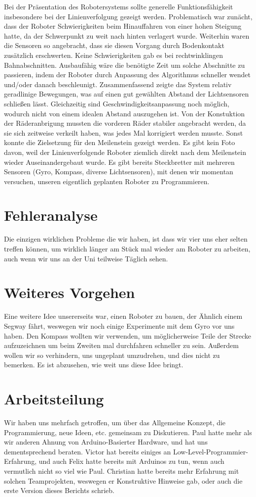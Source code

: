 \documentclass[11pt,a4paper]{article}
\begin{document}
Bei der Präsentation des Robotersystems sollte generelle Funktionsfähigkeit insbesondere bei der
Linienverfolgung gezeigt werden. Problematisch war zunächt, dass der Roboter Schwierigkeiten beim
Hinauffahren von einer hohen Steigung hatte, da der Schwerpunkt zu weit nach hinten verlagert 
wurde. Weiterhin waren die Sensoren so angebracht, dass sie diesen Vorgang durch Bodenkontakt 
zusätzlich erschwerten. Keine Schwierigkeiten gab es bei rechtwinklingen Bahnabschnitten. 
Ausbaufähig wäre die benötigte Zeit um solche Abschnitte zu passieren, indem der Roboter durch 
Anpassung des Algorithmus schneller wendet und/oder danach beschleunigt. Zusammenfassend zeigte 
das System relativ geradlinige Bewegungen, was auf einen gut gewählten Abstand der Lichtsensoren
schließen lässt. Gleichzeitig sind Geschwindigkeitsanpassung noch möglich, wodurch nicht von einem 
idealen Abstand auszugehen ist. Von der Konstuktion der Räderanbrigung mussten die vorderen Räder 
stabiler angebracht werden, da sie sich zeitweise verkeilt haben, was jedes Mal korrigiert werden
musste. Sonst konnte die Zielsetzung für den Meilenstein gezeigt werden. Es gibt kein Foto davon,
weil der Linienverfolgende Roboter ziemlich direkt nach dem Meilenstein wieder Auseinandergebaut
wurde. Es gibt bereits Steckbretter mit mehreren Sensoren (Gyro, Kompass, diverse Lichtsensoren),
mit denen wir momentan versuchen, unseren eigentlich geplanten Roboter zu Programmieren.

\section{Fehleranalyse}
Die einzigen wirklichen Probleme die wir haben, ist dass wir vier uns eher selten treffen können,
um wirklich länger am Stück mal wieder am Roboter zu arbeiten, auch wenn wir uns an der Uni
teilweise Täglich sehen.

\section{Weiteres Vorgehen}

Eine weitere Idee unsererseits war, einen Roboter zu bauen, der Ähnlich einem Segway fährt,
weswegen wir noch einige Experimente mit dem Gyro vor uns haben. Den Kompass wollten wir verwenden,
um möglicherweise Teile der Strecke aufzuzeichnen um beim Zweiten mal durchfahren schneller zu sein.
Außerdem wollen wir so verhindern, uns ungeplant umzudrehen, und dies nicht zu bemerken.
Es ist abzusehen, wie weit uns diese Idee bringt.

\section{Arbeitsteilung}
Wir haben uns mehrfach getroffen, um über das Allgemeine Konzept, die Programmierung, neue Ideen,
etc. gemeinsam zu Diskutieren. Paul hatte mehr als wir anderen Ahnung von Arduino-Basierter 
Hardware, und hat uns dementsprechend beraten. Victor hat bereits einiges an 
Low-Level-Programmier-Erfahrung, und auch Felix hatte bereits mit Arduinos zu tun, wenn auch 
vermutlich nicht so viel wie Paul. Christian hatte bereits mehr Erfahrung mit solchen 
Teamprojekten, weswegen er Konstruktive Hinweise gab, oder auch die erste Version dieses 
Berichts schrieb.
\end{document}
